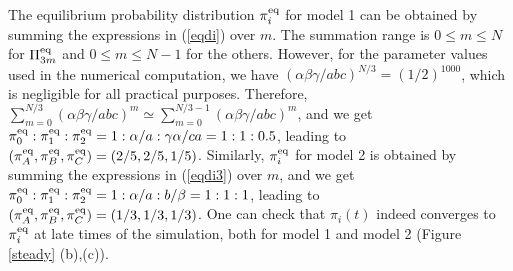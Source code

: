 \documentclass[aps,pre,amsmath,amssymb,floatfix,preprint,nofootinbib]{revtex4}
\begin{document}
The equilibrium probability distribution $\pi^{\rm eq}_i$ for model 1 can be obtained by summing the expressions in (\ref{eqdi}) over $m$. The summation range is $0 \le m \le N$ for $\Pi^{\rm eq}_{3m}$ and $0 \le m \le N-1$ for the others. However, for the parameter values used in the numerical computation, we have $({\alpha\beta\gamma}/{abc})^{N/3}=(1/2)^{1000}$, which is negligible for all practical purposes. Therefore, $\sum_{m=0}^{N/3}({\alpha\beta\gamma}/{abc})^m \simeq \sum_{m=0}^{N/3-1}({\alpha\beta\gamma}/{abc})^m$, and we get $\pi^{\rm eq}_0 : \pi^{\rm eq}_1 : \pi^{\rm eq}_2  = 1:\alpha/a: \gamma\alpha/ca = 1:1:0.5$, leading to $(\pi^{\rm eq}_A, \pi^{\rm eq}_B, \pi^{\rm eq}_C) = (2/5,2/5,1/5)$. Similarly, $\pi^{\rm eq}_i$ for model 2 is obtained by summing the expressions in (\ref{eqdi3}) over $m$, and we get $\pi^{\rm eq}_0 : \pi^{\rm eq}_1 : \pi^{\rm eq}_2  = 1:\alpha/a: b/\beta = 1:1:1$, leading to $(\pi^{\rm eq}_A, \pi^{\rm eq}_B, \pi^{\rm eq}_C) = (1/3,1/3,1/3)$. One can check that $\pi_i (t)$ indeed converges to $\pi^{\rm eq}_i$ at late times of the simulation, both for model 1 and model 2 (Figure \ref{steady} (b),(c)).

\end{document}
